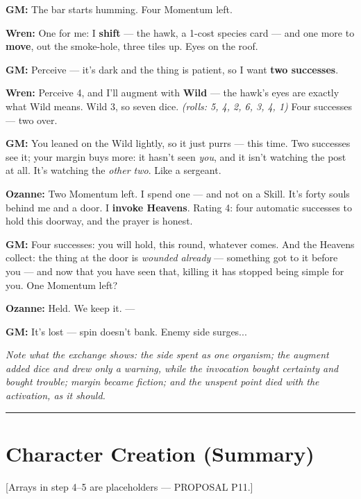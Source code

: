 \textbf{GM:} The bar starts humming. Four Momentum left.

\textbf{Wren:} One for me: I \textbf{shift} --- the hawk, a 1-cost species card --- and one more to \textbf{move}, out the smoke-hole, three tiles up. Eyes on the roof.

\textbf{GM:} Perceive --- it's dark and the thing is patient, so I want \textbf{two successes}.

\textbf{Wren:} Perceive 4, and I'll augment with \textbf{Wild} --- the hawk's eyes are exactly what Wild means. Wild 3, so seven dice. \textit{(rolls: 5, 4, 2, 6, 3, 4, 1)} Four successes --- two over.

\textbf{GM:} You leaned on the Wild lightly, so it just purrs --- this time. Two successes see it; your margin buys more: it hasn't seen \textit{you}, and it isn't watching the post at all. It's watching the \textit{other two}. Like a sergeant.

\textbf{Ozanne:} Two Momentum left. I spend one --- and not on a Skill. It's forty souls behind me and a door. I \textbf{invoke Heavens}. Rating 4: four automatic successes to hold this doorway, and the prayer is honest.

\textbf{GM:} Four successes: you will hold, this round, whatever comes. And the Heavens collect: the thing at the door is \textit{wounded already} --- something got to it before you --- and now that you have seen that, killing it has stopped being simple for you. One Momentum left?

\textbf{Ozanne:} Held. We keep it. ---

\textbf{GM:} It's lost --- spin doesn't bank. Enemy side surges...

\medskip

\textit{Note what the exchange shows: the side spent as one organism; the augment added dice and drew only a warning, while the invocation bought certainty and bought trouble; margin became fiction; and the unspent point died with the activation, as it should.}

\medskip\hrule\medskip

\section{Character Creation (Summary)}

[Arrays in step 4--5 are placeholders --- PROPOSAL P11.]

